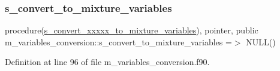 \subsubsection{\texorpdfstring{s\+\_\+convert\+\_\+to\+\_\+mixture\+\_\+variables}{s\_convert\_to\_mixture\_variables}}
{\footnotesize\ttfamily procedure(\hyperlink{interfacem__variables__conversion_1_1s__convert__xxxxx__to__mixture__variables}{s\+\_\+convert\+\_\+xxxxx\+\_\+to\+\_\+mixture\+\_\+variables}), pointer, public m\+\_\+variables\+\_\+conversion\+::s\+\_\+convert\+\_\+to\+\_\+mixture\+\_\+variables =$>$ N\+U\+LL()}



Definition at line 96 of file m\+\_\+variables\+\_\+conversion.\+f90.

